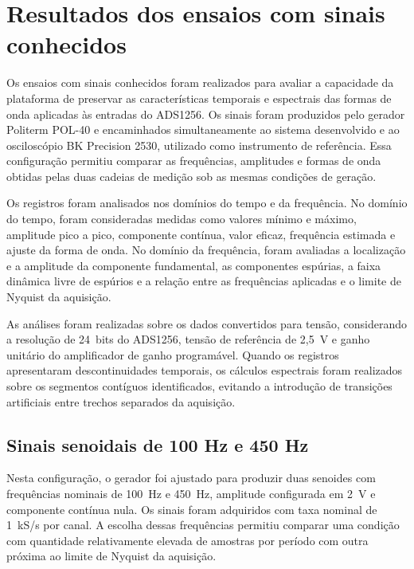 \documentclass[a4paper,12pt]{fcte}
\begin{document}
\section{Resultados dos ensaios com sinais conhecidos}
\label{sec:resultados_sinais_conhecidos}

Os ensaios com sinais conhecidos foram realizados para avaliar a capacidade da plataforma de preservar as características temporais e espectrais das formas de onda aplicadas às entradas do ADS1256. Os sinais foram produzidos pelo gerador Politerm POL-40 e encaminhados simultaneamente ao sistema desenvolvido e ao osciloscópio BK Precision 2530, utilizado como instrumento de referência. Essa configuração permitiu comparar as frequências, amplitudes e formas de onda obtidas pelas duas cadeias de medição sob as mesmas condições de geração.

Os registros foram analisados nos domínios do tempo e da frequência. No domínio do tempo, foram consideradas medidas como valores mínimo e máximo, amplitude pico a pico, componente contínua, valor eficaz, frequência estimada e ajuste da forma de onda. No domínio da frequência, foram avaliadas a localização e a amplitude da componente fundamental, as componentes espúrias, a faixa dinâmica livre de espúrios e a relação entre as frequências aplicadas e o limite de Nyquist da aquisição.

As análises foram realizadas sobre os dados convertidos para tensão, considerando a resolução de 24~bits do ADS1256, tensão de referência de 2,5~V e ganho unitário do amplificador de ganho programável. Quando os registros apresentaram descontinuidades temporais, os cálculos espectrais foram realizados sobre os segmentos contíguos identificados, evitando a introdução de transições artificiais entre trechos separados da aquisição.

\subsection{Sinais senoidais de 100 Hz e 450 Hz}
\label{subsec:senoides_alta_frequencia}

Nesta configuração, o gerador foi ajustado para produzir duas senoides com frequências nominais de 100~Hz e 450~Hz, amplitude configurada em 2~V e componente contínua nula. Os sinais foram adquiridos com taxa nominal de 1~kS/s por canal. A escolha dessas frequências permitiu comparar uma condição com quantidade relativamente elevada de amostras por período com outra próxima ao limite de Nyquist da aquisição.
\end{document}
